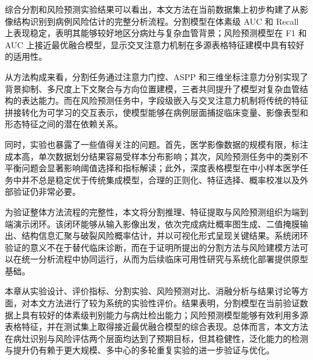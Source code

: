 
综合分割和风险预测实验结果可以看出，本文方法在当前数据集上初步构建了从影像结构识别到病例风险估计的完整分析流程。分割模型在体素级 AUC 和 Recall 上表现稳定，表明其能够较好地区分病灶与复杂血管背景；风险预测模型在 F1 和 AUC 上接近最优融合模型，显示交叉注意力机制在多源表格特征建模中具有较好的适用性。

从方法构成来看，分割任务通过注意力门控、ASPP 和三维坐标注意力分别实现了背景抑制、多尺度上下文聚合与方向位置建模，三者共同提升了模型对复杂血管结构的表达能力。而在风险预测任务中，字段级嵌入与交叉注意力机制将传统的特征拼接转化为可学习的交互表示，使模型能够在病例层面捕捉临床变量、影像表型和形态特征之间的潜在依赖关系。

同时，实验也暴露了一些值得关注的问题。首先，医学影像数据的规模有限，标注成本高，单次数据划分结果容易受样本分布影响；其次，风险预测任务中的类别不平衡问题会显著影响阈值选择和指标解读；此外，深度表格模型在中小样本医学任务中并不总是稳定优于传统集成模型，合理的正则化、特征选择、概率校准以及外部验证仍非常必要。

为验证整体方法流程的完整性，本文将分割推理、特征提取与风险预测组织为端到端演示闭环。该闭环能够从输入影像出发，依次完成病灶概率图生成、二值掩膜输出、结构信息汇聚与破裂风险概率估计，并以可视化形式呈现关键结果。系统闭环验证的意义不在于替代临床诊断，而在于证明所提出的分割方法与风险建模方法可以在统一分析流程中协同运行，从而为后续临床可用性研究与系统化部署提供原型基础。

本章从实验设计、评价指标、分割实验、风险预测对比、消融分析与结果讨论等方面，对本文方法进行了较为系统的实验性评价。结果表明，分割模型在当前验证数据上具有较好的体素级判别能力与病灶检出能力；风险预测模型能够有效利用多源表格特征，并在测试集上取得接近最优融合模型的综合表现。总体而言，本文方法在病灶识别与风险评估两个层面均达到了预期目标，但其稳健性，泛化能力的检测与提升仍有赖于更大规模、多中心的多轮重复实验的进一步验证与优化。